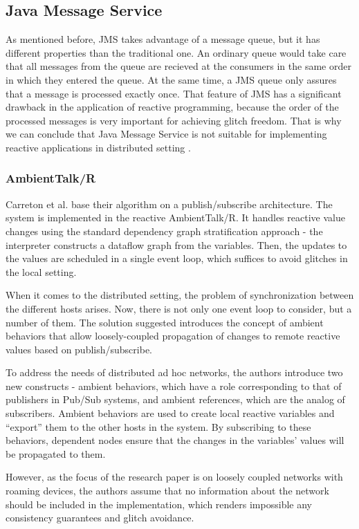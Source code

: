 \documentclass{sigplanconf}
\begin{document}
\subsection*{Java Message Service}

As mentioned before, JMS takes advantage of a message queue, but it has different properties than the traditional one. An ordinary queue would take care that all messages from the queue are recieved at the consumers in the same order in which they entered the queue. At the same time, a JMS queue only assures that a message is processed exactly once. That feature of JMS has a significant drawback in the application of reactive programming, because the order of the processed messages  is very important for achieving glitch freedom. That is why we can conclude that Java Message Service is not suitable for implementing reactive applications in distributed setting \cite{jms} \cite{jmsd}.

\subsubsection{AmbientTalk/R}
Carreton et al. \cite{loosely} base their algorithm on a publish/subscribe architecture. The system is implemented in the reactive AmbientTalk/R. It handles reactive value changes using the standard dependency graph stratification approach - the interpreter constructs a dataflow graph from the variables. Then, the updates to the values are scheduled in a single event loop, which suffices to avoid glitches in the local setting. 

When it comes to the distributed setting, the problem of synchronization between the different hosts arises. Now, there is not only one event loop to consider, but a number of them. The solution suggested introduces the concept of ambient behaviors that allow loosely-coupled propagation of changes to remote reactive values based on publish/subscribe. 

To address the needs of distributed ad hoc networks, the authors introduce two new constructs - ambient behaviors, which have a role corresponding to that of publishers in Pub/Sub systems, and ambient references, which are the analog of subscribers. Ambient behaviors are used to create local reactive variables and ``export'' them to the other hosts in the system. By subscribing to these behaviors, dependent nodes ensure that the changes in the variables' values will be propagated to them.

However, as the focus of the research paper is on loosely coupled networks with roaming devices, the authors assume that no information about the network should be included in the implementation, which renders impossible any consistency guarantees and glitch avoidance.
\end{document}
